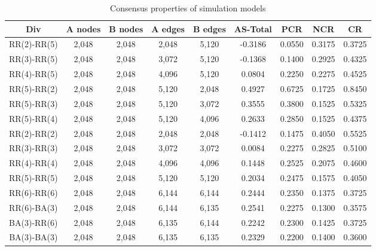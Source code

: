\begin{table}[!htb]
	\centering
    \caption{Consensus properties of simulation models}
	\label{Consensus properties of Simulation Models}
	\begin{center}
		\begin{tabular}{c|c|c|c|c|c|c|c|c} \hline\hline
			Div                    & A nodes& B nodes & A edges & B edges & AS-Total  & PCR    & NCR    & CR       \\ \hline \hline
			RR(2)-RR(5)            & 2,048  & 2,048   & 2,048   & 5,120   & -0.3186   & 0.0550 & 0.3175 & 0.3725   \\ \hline
			RR(3)-RR(5)            & 2,048  & 2,048   & 3,072   & 5,120   & -0.1368   & 0.1400 & 0.2925 & 0.4325   \\ \hline
			RR(4)-RR(5)            & 2,048  & 2,048   & 4,096   & 5,120   &  0.0804   & 0.2250 & 0.2275 & 0.4525   \\ \hline
			RR(5)-RR(2)            & 2,048 	& 2,048   & 5,120   & 2,048   &  0.4927   & 0.6725 & 0.1725 & 0.8450   \\ \hline	
			RR(5)-RR(3)            & 2,048 	& 2,048   & 5,120   & 3,072   &  0.3555   & 0.3800 & 0.1525 & 0.5325   \\ \hline
			RR(5)-RR(4)            & 2,048  & 2,048   & 5,120   & 4,096   &  0.2633   & 0.2850 & 0.1525 & 0.4375   \\ \hline
			RR(2)-RR(2)            & 2,048  & 2,048   & 2,048   & 2,048   & -0.1412   & 0.1475 & 0.4050 & 0.5525   \\ \hline
			RR(3)-RR(3)            & 2,048  & 2,048   & 3,072   & 3,072   &  0.0084   & 0.2275 & 0.2825 & 0.5100   \\ \hline
			RR(4)-RR(4)            & 2,048  & 2,048   & 4,096   & 4,096   &  0.1448   & 0.2525 & 0.2075 & 0.4600   \\ \hline
			RR(5)-RR(5)            & 2,048  & 2,048   & 5,120   & 5,120   &  0.2034   & 0.2475 & 0.1575 & 0.4050   \\ \hline
			RR(6)-RR(6)            & 2,048  & 2,048   & 6,144   & 6,144   &  0.2444   & 0.2350 & 0.1375 & 0.3725   \\ \hline
			RR(6)-BA(3)            & 2,048 	& 2,048   & 6,144   & 6,135   &  0.2541   & 0.2275 & 0.1300 & 0.3575   \\ \hline 
			BA(3)-RR(6)            & 2,048 	& 2,048   & 6,135   & 6,144   &  0.2242   & 0.2300 & 0.1425 & 0.3725   \\ \hline
			BA(3)-BA(3)            & 2,048 	& 2,048   & 6,135   & 6,135   &  0.2329   & 0.2200 & 0.1400 & 0.3600   \\ \hline

\end{tabular}
\end{center}
\end{table}
